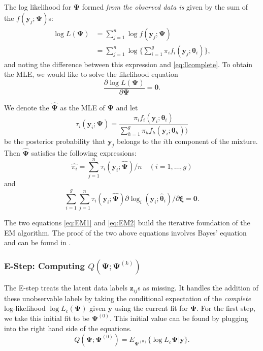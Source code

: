 \documentclass{article}\usepackage[]{graphicx}\usepackage[]{xcolor}
\theoremstyle{plain}
\theoremstyle{definition}
\theoremstyle{remark}
\newcommand{\boldz}{\mathbf{z}}
\newcommand{\boldy}{\mathbf{y}}
\newcommand{\boldtheta}{\boldsymbol{\theta}}
\newcommand{\boldPsi}{\boldsymbol{\Psi}}
\newcommand{\boldxi}{\boldsymbol{\xi}}
\begin{document}
The log likelihood for $\boldPsi$ formed \textit{from the observed data is} given by the sum of the $f(\boldy_j ; \boldPsi)$s:
\begin{align*}
    \log L(\boldPsi) &= \sum_{j=1}^n \log f(\boldy_j ; \boldPsi) \\
    &=  \sum_{j=1}^n \log \{ \sum_{i=1}^g \pi_i f_i (\boldy_j ; \boldtheta_i) \},
\end{align*}
and noting the difference between this expression and \eqref{eq:llcomplete}.
To obtain the MLE, we would like to solve the likelihood equation 
\begin{equation}
    \frac{\partial \log L(\boldPsi)}{\partial \boldPsi} = \textbf{0}. 
\end{equation}

We denote the $\hat{\boldPsi}$ as the MLE of $\boldPsi$ and let
\begin{equation} \label{eq:EMtau}
    \tau_i (\boldy_i ; \boldPsi) = \frac{\pi_i f_i (\boldy_i;\boldtheta_i)}{\sum_{h=1}^g \pi_h f_h (\boldy_i;\boldtheta_h))}
\end{equation}
be the posterior probability that $\boldy_j$ belongs to the $i$th component of the mixture. %
Then $\hat{\boldPsi}$ satisfies the following expressions:
\begin{equation} \label{eq:EM1}
    \hat{\pi_i} = \sum_{j=1}^n \tau_i (\boldy_i ; \hat{\boldPsi}) / n \quad (i = 1, \dots, g)
\end{equation}
and
\begin{equation} \label{eq:EM2}
    \sum_{i=1}^g \sum_{j=1}^n \tau_i (\boldy_i ; \hat{\boldPsi})  \partial \log_i (\boldy_i;\hat{\boldtheta}_i) / \partial \boldxi = \textbf{0}.
\end{equation}

The two equations \eqref{eq:EM1} and \eqref{eq:EM2} build the iterative foundation of the EM algorithm. The proof of the two above equations involves Bayes' equation and can be found in \cite[Section 1.4]{EM_Book}.

\subsubsection*{E-Step: Computing $Q(\boldPsi; \boldPsi^{(k)})$}
The E-step treats the latent data labels $\boldz_{ij}$s as missing. It handles the addition of these unobservable labels by taking the conditional expectation of the \textit{complete} log-likelihood $\log L_c (\boldPsi)$ given $\boldy$ using the current fit for $\boldPsi$. For the first step, we take this initial fit to be $\boldPsi^{(0)}$. This initial value can be found by plugging into the right hand side of the equations.
\begin{equation} \label{eq:EMFirstStep}
Q(\boldPsi; \boldPsi^{(0)}) = E_{\boldPsi^{(0)}} \{\log L_c{\boldPsi} \vert \boldy\}.
\end{equation}
\end{document}
